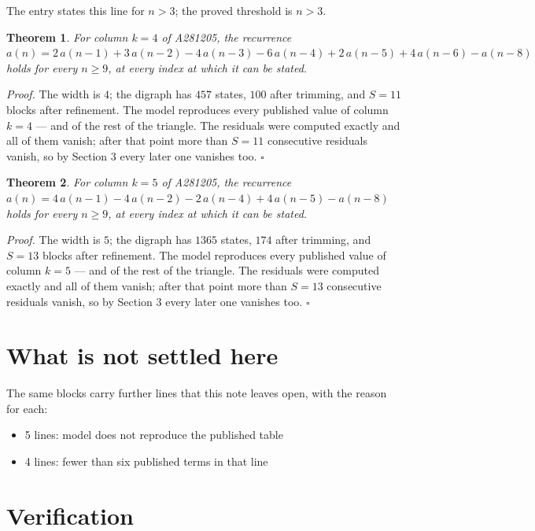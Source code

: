 \documentclass[11pt]{article}
\newtheorem{theorem}{Theorem}
\theoremstyle{definition}
\begin{document}
The entry states this line for $n > 3$; the proved threshold is $n > 3$.

\begin{theorem} For column $k = 4$ of A281205, the recurrence $a(n) = 2\,a(n-1) + 3\,a(n-2) - 4\,a(n-3) - 6\,a(n-4) + 2\,a(n-5) + 4\,a(n-6) - a(n-8)$ holds for every $n \ge 9$, at every index at which it can be stated.\end{theorem}

{\itshape Proof.} The width is $4$; the digraph has $457$ states, $100$ after trimming, and $S = 11$ blocks after refinement. The model reproduces every published value of column $k = 4$ --- and of the rest of the triangle. The residuals were computed exactly and all of them vanish; after that point more than $S = 11$ consecutive residuals vanish, so by Section 3 every later one vanishes too. $\square$

\begin{theorem} For column $k = 5$ of A281205, the recurrence $a(n) = 4\,a(n-1) - 4\,a(n-2) - 2\,a(n-4) + 4\,a(n-5) - a(n-8)$ holds for every $n \ge 9$, at every index at which it can be stated.\end{theorem}

{\itshape Proof.} The width is $5$; the digraph has $1365$ states, $174$ after trimming, and $S = 13$ blocks after refinement. The model reproduces every published value of column $k = 5$ --- and of the rest of the triangle. The residuals were computed exactly and all of them vanish; after that point more than $S = 13$ consecutive residuals vanish, so by Section 3 every later one vanishes too. $\square$

\section{What is not settled here}

The same blocks carry further lines that this note leaves open, with the reason for each:

\begin{itemize}

\item 5 lines: model does not reproduce the published table

\item 4 lines: fewer than six published terms in that line

\end{itemize}

\section{Verification}
\end{document}
